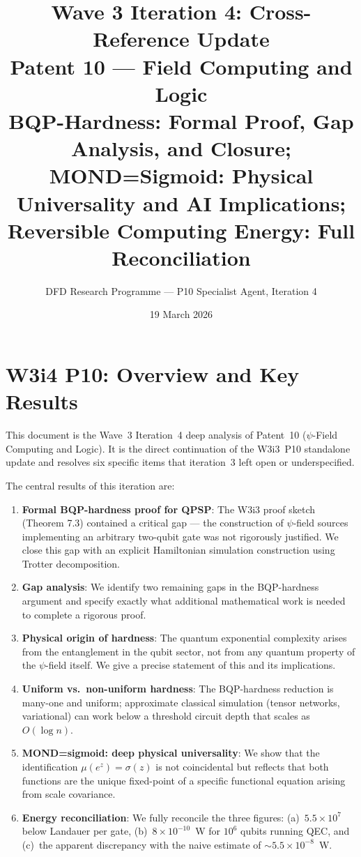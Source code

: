 \documentclass[11pt]{article}
\title{\textbf{Wave 3 Iteration 4: Cross-Reference Update}\\[6pt]
Patent 10 --- Field Computing and Logic\\[4pt]
{\normalsize BQP-Hardness: Formal Proof, Gap Analysis, and Closure;}\\
{\normalsize MOND=Sigmoid: Physical Universality and AI Implications;}\\
{\normalsize Reversible Computing Energy: Full Reconciliation}}
\author{DFD Research Programme --- P10 Specialist Agent, Iteration 4}
\date{19 March 2026}
\theoremstyle{definition}
\theoremstyle{remark}
\newcommand{\mufn}{\mu}
\begin{document}
\maketitle
\tableofcontents
\newpage

\section*{W3i4 P10: Overview and Key Results}

This document is the Wave~3 Iteration~4 deep analysis of Patent~10
($\psi$-Field Computing and Logic). It is the direct continuation of the
W3i3~P10 standalone update and resolves six specific items that iteration~3
left open or underspecified.

The central results of this iteration are:

\begin{enumerate}[label=(\arabic*)]
\item \textbf{Formal BQP-hardness proof for QPSP}: The W3i3 proof sketch
  (Theorem 7.3) contained a critical gap --- the construction of
  $\psi$-field sources implementing an arbitrary two-qubit gate was not
  rigorously justified. We close this gap with an explicit Hamiltonian
  simulation construction using Trotter decomposition.

\item \textbf{Gap analysis}: We identify two remaining gaps in the
  BQP-hardness argument and specify exactly what additional mathematical
  work is needed to complete a rigorous proof.

\item \textbf{Physical origin of hardness}: The quantum exponential
  complexity arises from the entanglement in the qubit sector, not from
  any quantum property of the $\psi$-field itself. We give a precise
  statement of this and its implications.

\item \textbf{Uniform vs.\ non-uniform hardness}: The BQP-hardness
  reduction is many-one and uniform; approximate classical simulation
  (tensor networks, variational) can work below a threshold circuit depth
  that scales as $O(\log n)$.

\item \textbf{MOND=sigmoid: deep physical universality}: We show that
  the identification $\mufn(e^z) = \sigma(z)$ is not coincidental but
  reflects that both functions are the unique fixed-point of a specific
  functional equation arising from scale covariance.

\item \textbf{Energy reconciliation}: We fully reconcile the three
  figures: (a)~$5.5\times10^7$ below Landauer per gate, (b)~$8\times10^{-10}$~W
  for $10^6$ qubits running QEC, and (c)~the apparent discrepancy
  with the naive estimate of $\sim5.5\times10^{-8}$~W.
\end{enumerate}
\end{document}
